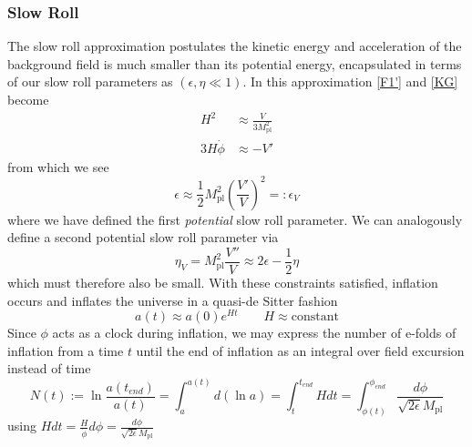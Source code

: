 \documentclass[a4paper,10pt]{article}
\newcommand{\Mp}{M_{\text{pl}}}
\newcommand{\half}{\frac{1}{2}}
\begin{document}
\subsubsection{Slow Roll}

The slow roll approximation postulates the kinetic energy and acceleration of the background field is much smaller than its potential energy, encapsulated in terms of our slow roll parameters as $(\epsilon, \eta \ll 1)$. In this approximation \ref{F1'} and \ref{KG} become
\begin{equation}\begin{split}
H^2 &\approx \frac{V}{3\Mp^2} \\
3H\dot{\phi} &\approx -V'
\end{split}\end{equation}
from which we see 
\begin{equation}
\epsilon \approx \half\Mp^2 \left(\frac{V'}{V}\right)^2 =: \epsilon_V
\end{equation}
where we have defined the first \textit{potential} slow roll parameter. We can analogously define a second potential slow roll parameter via
\begin{equation}
\eta_V = \Mp^2 \frac{V''}{V} \approx 2\epsilon - \half\eta
\end{equation}
which must therefore also be small. With these constraints satisfied, inflation occurs and inflates the universe in a quasi-de Sitter fashion
\begin{equation}
a(t) \approx a(0)e^{Ht} \qquad H\approx\text{constant}
\end{equation} 
Since $\phi$ acts as a clock during inflation, we may express the number of e-folds of inflation from a time $t$ until the end of inflation as an integral over field excursion instead of time
\begin{equation}
N(t) := \ln{\frac{a(t_{end})}{a(t)}} = \int_a^{a(t)} d(\ln{a}) = \int_t^{t_{end}} Hdt = \int_{\phi(t)}^{\phi_{end}} \frac{d\phi}{\sqrt{2\epsilon}\Mp}
\label{efolds}
\end{equation}
using $Hdt=\frac{H}{\dot{\phi}}d\phi=\frac{d\phi}{\sqrt{2\epsilon}\Mp}$
\end{document}
